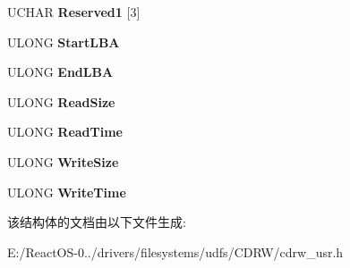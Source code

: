 \begin{DoxyCompactItemize}
\begin{tabbing}
\end{tabbing}\item 
\mbox{\label{struct___s_e_t___s_t_r_e_a_m_i_n_g___u_s_e_r___i_n_a9b5da34261fb008253d2fa0ff7712d99}} 
U\+C\+H\+AR {\bfseries Reserved1} \mbox{[}3\mbox{]}
\item 
\mbox{\label{struct___s_e_t___s_t_r_e_a_m_i_n_g___u_s_e_r___i_n_a3f78bd0420e13746f0cb0eb7d009c5f2}} 
U\+L\+O\+NG {\bfseries Start\+L\+BA}
\item 
\mbox{\label{struct___s_e_t___s_t_r_e_a_m_i_n_g___u_s_e_r___i_n_a388a6e7e986e8f01a866e01624455a06}} 
U\+L\+O\+NG {\bfseries End\+L\+BA}
\item 
\mbox{\label{struct___s_e_t___s_t_r_e_a_m_i_n_g___u_s_e_r___i_n_ac73c81a72fd753519462d53964ba38d8}} 
U\+L\+O\+NG {\bfseries Read\+Size}
\item 
\mbox{\label{struct___s_e_t___s_t_r_e_a_m_i_n_g___u_s_e_r___i_n_a424dd4554305e1cccce78144f17e429e}} 
U\+L\+O\+NG {\bfseries Read\+Time}
\item 
\mbox{\label{struct___s_e_t___s_t_r_e_a_m_i_n_g___u_s_e_r___i_n_af805f3100dd951c817d5d7cf521fbeb4}} 
U\+L\+O\+NG {\bfseries Write\+Size}
\item 
\mbox{\label{struct___s_e_t___s_t_r_e_a_m_i_n_g___u_s_e_r___i_n_addf64ba1b7eb0dda343ce6ca0ec52a5f}} 
U\+L\+O\+NG {\bfseries Write\+Time}
\end{DoxyCompactItemize}


该结构体的文档由以下文件生成\+:\begin{DoxyCompactItemize}
\item 
E\+:/\+React\+O\+S-\/0../drivers/filesystems/udfs/\+C\+D\+R\+W/cdrw\+\_\+usr.\+h\end{DoxyCompactItemize}
